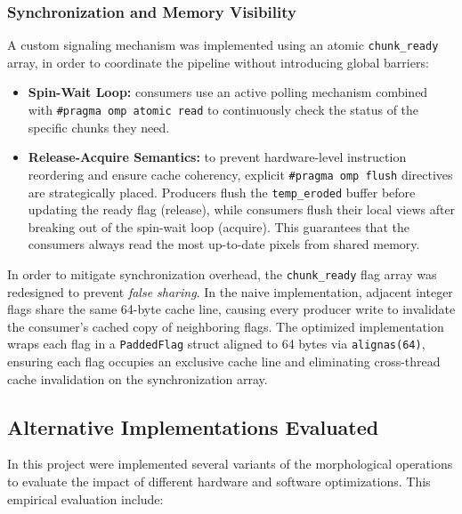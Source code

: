 \documentclass[10pt,twocolumn,letterpaper]{article}
\begin{document}
\subsubsection{Synchronization and Memory Visibility}
A custom signaling mechanism was implemented using an atomic \lstinline|chunk_ready| array, in order to coordinate the pipeline without introducing global barriers:
\begin{itemize}
    \item \textbf{Spin-Wait Loop:} consumers use an active polling mechanism combined with \lstinline|#pragma omp atomic read| to continuously check the status of the specific chunks they need.
    \item \textbf{Release-Acquire Semantics:} to prevent hardware-level instruction reordering and ensure cache coherency, explicit \lstinline|#pragma omp flush| directives are strategically placed. Producers flush the \lstinline|temp_eroded| buffer before updating the ready flag (release), while consumers flush their local views after breaking out of the spin-wait loop (acquire). This guarantees that the consumers always read the most up-to-date pixels from shared memory.
\end{itemize}

In order to mitigate synchronization overhead, the \lstinline|chunk_ready| 
flag array was redesigned to prevent \textit{false sharing}. In the naive 
implementation, adjacent integer flags share the same 64-byte cache line, 
causing every producer write to invalidate the consumer's cached copy of 
neighboring flags. 
The optimized implementation wraps each flag in a \lstinline|PaddedFlag| 
struct aligned to 64 bytes via \lstinline|alignas(64)|, ensuring each flag 
occupies an exclusive cache line and eliminating cross-thread cache 
invalidation on the synchronization array.

\subsection{Alternative Implementations Evaluated}
\label{subsec:alternative_implementations}

In this project were implemented several variants of the morphological operations to evaluate the impact of different hardware and software optimizations. This empirical evaluation include:
\end{document}
